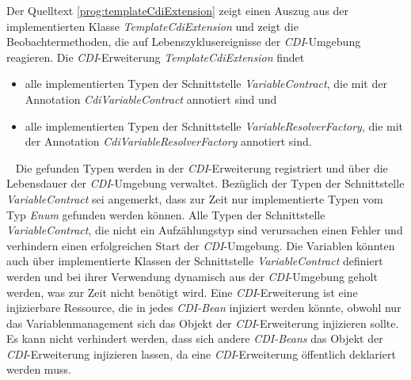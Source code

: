 \newline
\newline
Der Quelltext \ref{prog:templateCdiExtension} zeigt einen Auszug aus der implementierten Klasse \emph{TemplateCdiExtension} und zeigt die Beobachtermethoden, die auf Lebenszyklusereignisse der \emph{CDI}-Umgebung reagieren. Die  \emph{CDI}-Erweiterung \emph{TemplateCdiExtension} findet
\begin{itemize}
	\item alle implementierten Typen der Schnittstelle \emph{VariableContract}, die mit der Annotation \emph{CdiVariableContract} annotiert sind und
	\item alle implementierten Typen der Schnittstelle \emph{VariableResolverFactory}, die mit der Annotation \emph{CdiVariableResolverFactory} annotiert sind.
\end{itemize}
\ \newline
Die gefunden Typen werden in der \emph{CDI}-Erweiterung registriert und über die Lebensdauer der \emph{CDI}-Umgebung verwaltet. Bezüglich der Typen der Schnittstelle \emph{VariableContract} sei angemerkt, dass zur Zeit nur implementierte Typen vom Typ \emph{Enum} gefunden werden können. Alle Typen der Schnittstelle \emph{VariableContract}, die nicht ein Aufzählungstyp sind verursachen einen Fehler und verhindern einen erfolgreichen Start der \emph{CDI}-Umgebung. Die Variablen könnten auch über implementierte Klassen der Schnittstelle \emph{VariableContract} definiert werden und bei ihrer Verwendung dynamisch aus der \emph{CDI}-Umgebung geholt werden, was zur Zeit nicht benötigt wird.
\newline
\newline
Eine \emph{CDI}-Erweiterung ist eine injizierbare Ressource, die in jedes \emph{CDI-Bean} injiziert werden könnte, obwohl nur das Variablenmanagement sich das Objekt der \emph{CDI}-Erweiterung injizieren sollte. Es kann nicht verhindert werden, dass sich andere \emph{CDI-Beans} das Objekt der \emph{CDI}-Erweiterung injizieren lassen, da eine \emph{CDI}-Erweiterung öffentlich deklariert werden muss.
\newpage

